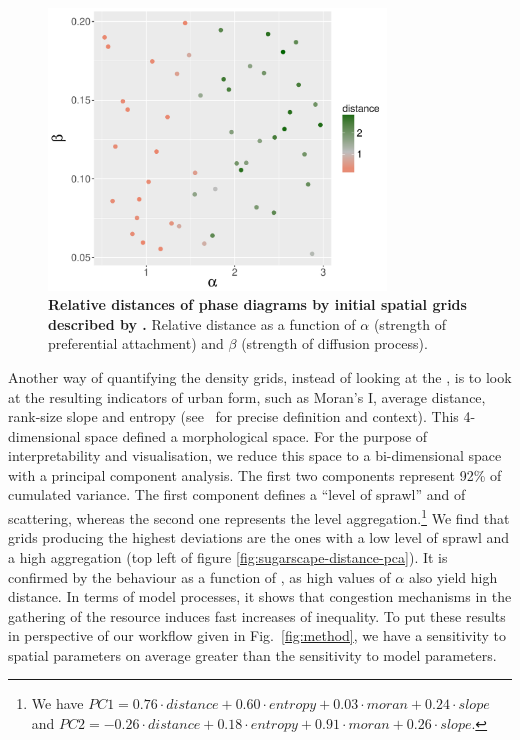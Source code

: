 \documentclass[preprint,5p,times,twocolumn,authoryear]{elsarticle}
\begin{document}
\begin{figure}
\centering
\includegraphics[width=0.8\textwidth]{figures/relativedistance_metaparams}
\caption{\textbf{Relative distances of phase diagrams by initial spatial grids described by .} Relative distance as a function of  $\alpha$ (strength of preferential attachment) and $\beta$ (strength of diffusion process).}
\label{fig:sugarscape-distance-meta}
\end{figure}

Another way of quantifying the density grids, instead of looking at the , is to look at the resulting indicators of urban form, such as Moran's I, average distance, rank-size slope and entropy (see~\cite{LeNechet2015} for precise definition and context). This 4-dimensional space defined a morphological space. For the purpose of interpretability and visualisation, we reduce this space to a bi-dimensional space with a principal component analysis. The first two components represent 92\% of cumulated variance. The first component defines a ``level of sprawl'' and of scattering, whereas the second one represents the level aggregation.\footnote{We have $PC1 = 0.76\cdot distance + 0.60\cdot entropy + 0.03\cdot moran + 0.24\cdot slope$ and $PC2 = -0.26\cdot distance + 0.18\cdot entropy + 0.91\cdot moran + 0.26\cdot slope$.} We find that grids producing the highest deviations are the ones with a low level of sprawl and a high aggregation (top left of figure \ref{fig:sugarscape-distance-pca}). It is confirmed by the behaviour as a function of , as high values of $\alpha$ also yield high distance. In terms of model processes, it shows that congestion mechanisms in the gathering of the resource induces fast increases of inequality. To put these results in perspective of our workflow given in Fig.~\ref{fig:method}, we have a sensitivity to spatial parameters on average greater than the sensitivity to model parameters.
\end{document}
